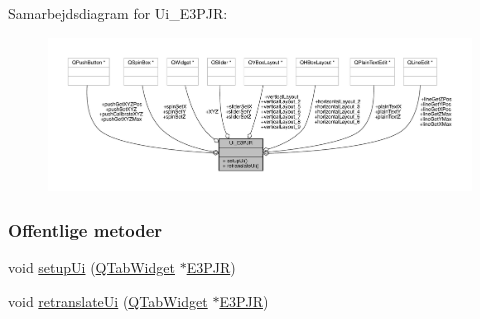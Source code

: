Samarbejdsdiagram for Ui\+\_\+\+E3\+P\+JR\+:
\nopagebreak
\begin{figure}[H]
\begin{center}
\leavevmode
\includegraphics[width=350pt]{class_ui___e3_p_j_r__coll__graph}
\end{center}
\end{figure}
\subsubsection*{Offentlige metoder}
\begin{DoxyCompactItemize}
\item 
void \hyperlink{class_ui___e3_p_j_r_acd00a207b203ce4e08e2d4fe020281d2}{setup\+Ui} (\hyperlink{class_q_tab_widget}{Q\+Tab\+Widget} $\ast$\hyperlink{class_e3_p_j_r}{E3\+P\+JR})
\item 
void \hyperlink{class_ui___e3_p_j_r_ab4d1867d3517a19d5b74c57ffd921202}{retranslate\+Ui} (\hyperlink{class_q_tab_widget}{Q\+Tab\+Widget} $\ast$\hyperlink{class_e3_p_j_r}{E3\+P\+JR})
\end{DoxyCompactItemize}
